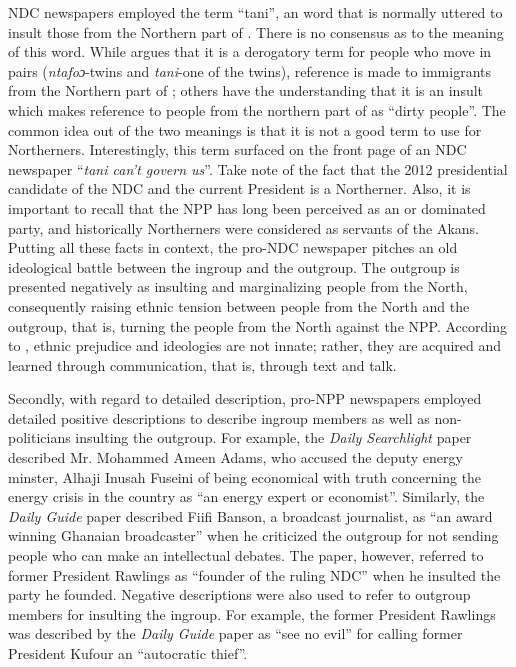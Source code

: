 \documentclass[output=paper,modfonts]{langscibook}
\begin{document}
NDC newspapers employed the term “tani”, an  word that is normally uttered to insult those from the Northern part of . There is no consensus as to the meaning of this word. While \citet{Agyekum2010taboo} argues that it is a derogatory term for people who move in pairs (\textit{ntafoɔ}{}-twins and \textit{tani}{}-one of the twins), reference is made to immigrants from the Northern part of ; others have the understanding that it is an insult which makes reference to people from the northern part of  as “dirty people”. The common idea out of the two meanings is that it is not a good term to use for Northerners. Interestingly, this term surfaced on the front page of an NDC newspaper “\textit{tani can’t govern us}”. Take note of the fact that the 2012 presidential candidate of the NDC and the current President is a Northerner. Also, it is important to recall that the NPP has long been perceived as an  or  dominated party, and historically Northerners were considered as servants of the Akans. Putting all these facts in context, the pro-NDC newspaper pitches an old ideological battle between the ingroup and the outgroup. The outgroup is presented negatively as insulting and marginalizing people from the North, consequently raising ethnic tension between people from the North and the outgroup, that is, turning the people from the North against the NPP. According to \citet{vanDijk2001}, ethnic prejudice and ideologies are not innate; rather, they are acquired and learned through communication, that is, through text and talk. 

Secondly, with regard to detailed description, pro-NPP newspapers employed detailed positive descriptions to describe ingroup members as well as non-politicians insulting the outgroup. For example, the \textit{Daily Searchlight} paper described Mr. Mohammed Ameen Adams, who accused the deputy energy minster, Alhaji Inusah Fuseini of being economical with truth concerning the energy crisis in the country as “an energy expert or economist”. Similarly, the \textit{Daily Guide} paper described Fiifi Banson, a broadcast journalist, as “an award winning Ghanaian broadcaster” when he criticized the outgroup for not sending people who can make an intellectual debates. The paper, however, referred to former President Rawlings as “founder of the ruling NDC” when he insulted the party he founded. Negative descriptions were also used to refer to outgroup members for insulting the ingroup. For example, the former President Rawlings was described by the \textit{Daily Guide} paper as “see no evil” for calling former President Kufour an “autocratic thief”.
\end{document}
